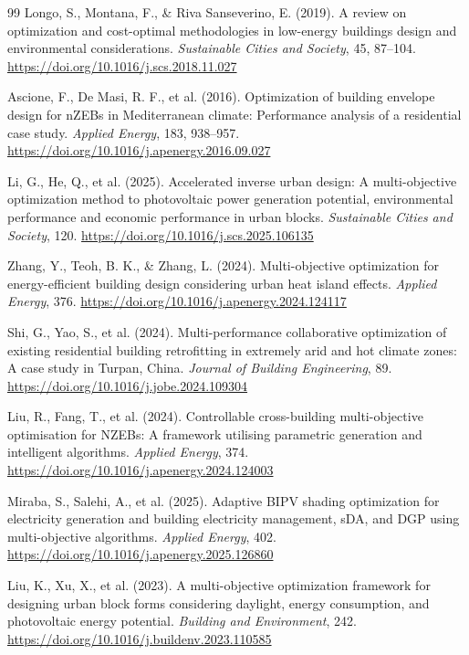 \begin{thebibliography}{99}
Longo, S., Montana, F., \& Riva Sanseverino, E. (2019). A review on optimization and cost-optimal methodologies in low-energy buildings design and environmental considerations. \textit{Sustainable Cities and Society}, 45, 87--104. \url{https://doi.org/10.1016/j.scs.2018.11.027}

Ascione, F., De Masi, R. F., et al. (2016). Optimization of building envelope design for nZEBs in Mediterranean climate: Performance analysis of a residential case study. \textit{Applied Energy}, 183, 938--957. \url{https://doi.org/10.1016/j.apenergy.2016.09.027}

Li, G., He, Q., et al. (2025). Accelerated inverse urban design: A multi-objective optimization method to photovoltaic power generation potential, environmental performance and economic performance in urban blocks. \textit{Sustainable Cities and Society}, 120. \url{https://doi.org/10.1016/j.scs.2025.106135}

Zhang, Y., Teoh, B. K., \& Zhang, L. (2024). Multi-objective optimization for energy-efficient building design considering urban heat island effects. \textit{Applied Energy}, 376. \url{https://doi.org/10.1016/j.apenergy.2024.124117}

Shi, G., Yao, S., et al. (2024). Multi-performance collaborative optimization of existing residential building retrofitting in extremely arid and hot climate zones: A case study in Turpan, China. \textit{Journal of Building Engineering}, 89. \url{https://doi.org/10.1016/j.jobe.2024.109304}

Liu, R., Fang, T., et al. (2024). Controllable cross-building multi-objective optimisation for NZEBs: A framework utilising parametric generation and intelligent algorithms. \textit{Applied Energy}, 374. \url{https://doi.org/10.1016/j.apenergy.2024.124003}

Miraba, S., Salehi, A., et al. (2025). Adaptive BIPV shading optimization for electricity generation and building electricity management, sDA, and DGP using multi-objective algorithms. \textit{Applied Energy}, 402. \url{https://doi.org/10.1016/j.apenergy.2025.126860}

Liu, K., Xu, X., et al. (2023). A multi-objective optimization framework for designing urban block forms considering daylight, energy consumption, and photovoltaic energy potential. \textit{Building and Environment}, 242. \url{https://doi.org/10.1016/j.buildenv.2023.110585}


\end{thebibliography}
